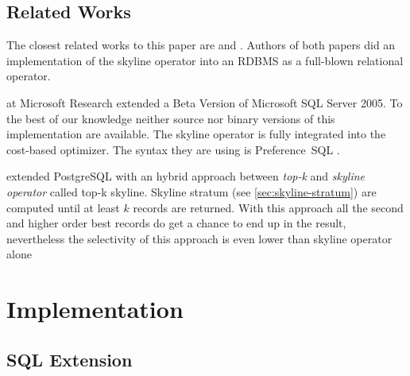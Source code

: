 \section{Related Works}
The closest related works to this paper are \citep{Chaudhuri2006}
and \citep{Goncalves2005, Goncalves2005a}.  Authors of both papers did an
implementation of the skyline operator into an RDBMS as a full-blown
relational operator.

\citet{Chaudhuri2006} at Microsoft Research extended a Beta
Version of Microsoft SQL Server 2005.  To the best of our knowledge
neither source nor binary versions of this implementation are
available.  The skyline operator is fully integrated into the
cost-based optimizer.  The syntax they are using is Preference~SQL 
\citep{Kiessling2002a}.


\citep{Goncalves2005} extended PostgreSQL with an hybrid approach 
between \emph{top-k} and \emph{skyline operator} called top-k skyline.
Skyline stratum (see \autoref{sec:skyline-stratum}) are computed until
at least $k$ records are returned.  With this approach all the second
and higher order best records do get a chance to end up in the result,
nevertheless the selectivity of this approach is even lower than
skyline operator alone






\chapter{Implementation}
\label{chap:implementation}
\section{SQL Extension}
\label{sec:sql-extension}

\enlargethispage{\baselineskip}

